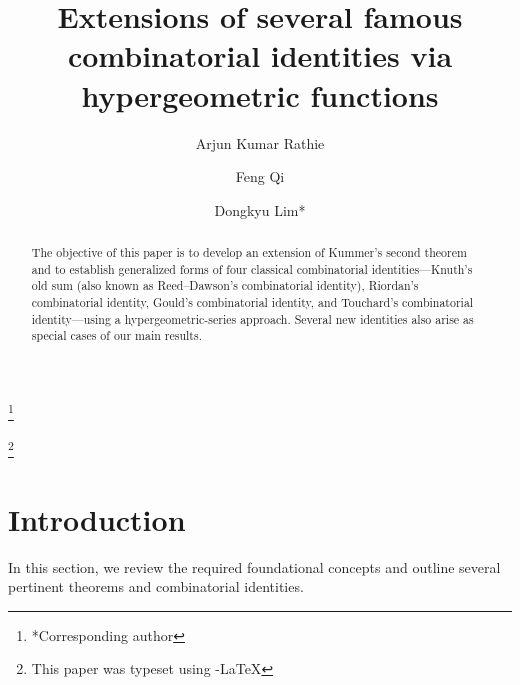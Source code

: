 \documentclass[reqno]{amsart}
\numberwithin{equation}{section}
\theoremstyle{plain}
\theoremstyle{remark}
\begin{document}
\title[Extensions of four famous combinatorial identities]
{Extensions of several famous combinatorial identities via hypergeometric functions}

\author[A. K. Rathie]{Arjun Kumar Rathie}
\address{Department of Mathematics, Vedant College of Engineering and Technololy, (Rajasthan Technical University), Tulsi, Jakhamund, Bundi Rajasthan State, India}

\author[F. Qi]{Feng Qi}
\address{School of Mathematics and Physics, Hulunbuir University, Hulunbuir 021008, Inner Mongolia, China;
17709 Sabal Court, University Village, Dallas, TX 75252-8024, USA}

\author[D. Lim]{Dongkyu Lim*}
\address{Department of Mathematics Education, Gyeongkuk National University, Andong 36729, Republic of Korea}

\begin{abstract}
The objective of this paper is to develop an extension of Kummer's second theorem and to establish generalized forms of four classical combinatorial identities---Knuth's old sum (also known as Reed--Dawson's combinatorial identity), Riordan's combinatorial identity, Gould's combinatorial identity, and Touchard's combinatorial identity---using a hypergeometric-series approach. Several new identities also arise as special cases of our main results.
\end{abstract}



\thanks{*Corresponding author}

\thanks{This paper was typeset using \AmS-\LaTeX}

\maketitle

\section{Introduction}
In this section, we review the required foundational concepts and outline several pertinent theorems and combinatorial identities.
\end{document}
